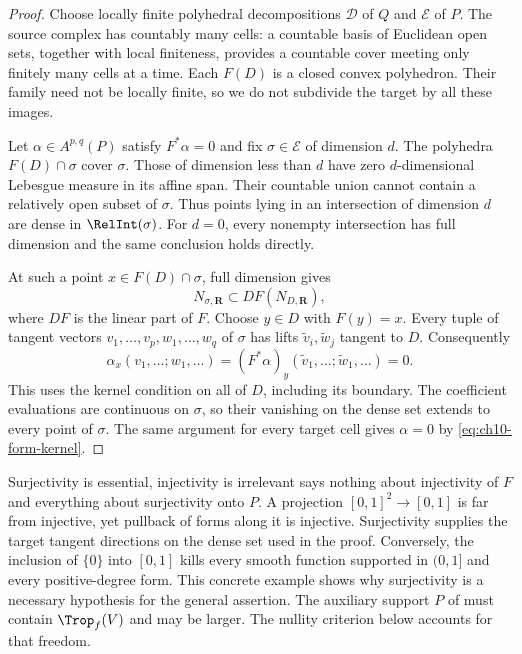 \begin{proof}
Choose locally finite polyhedral decompositions $\mathscr D$ of $Q$ and
$\mathscr E$ of $P$.  The source complex has countably many cells: a
countable basis of Euclidean open sets, together with local finiteness,
provides a countable cover meeting only finitely many cells at a time.
Each $F(D)$ is a closed convex polyhedron.  Their family need not be
locally finite, so we do not subdivide the target by all these images.

Let $\alpha\in A^{p,q}(P)$ satisfy $F^*\alpha=0$ and fix
$\sigma\in\mathscr E$ of dimension $d$.  The polyhedra
$F(D)\cap\sigma$ cover $\sigma$.  Those of dimension less than $d$ have
zero $d$-dimensional Lebesgue measure in its affine span.  Their countable
union cannot contain a relatively open subset of $\sigma$.  Thus points
lying in an intersection of dimension $d$ are dense in
$\RelInt(\sigma)$.  For $d=0$, every nonempty intersection has full
dimension and the same conclusion holds directly.

At such a point $x\in F(D)\cap\sigma$, full dimension gives
\[
 N_{\sigma,\mathbf R}\subset DF(N_{D,\mathbf R}),
\]
where $DF$ is the linear part of $F$.  Choose $y\in D$ with $F(y)=x$.
Every tuple of tangent vectors $v_1,\ldots,v_p,w_1,\ldots,w_q$ of $\sigma$
has lifts $\widetilde v_i,\widetilde w_j$ tangent to $D$.  Consequently
\[
 \alpha_x(v_1,\ldots;w_1,\ldots)
 =(F^*\alpha)_y(\widetilde v_1,\ldots;\widetilde w_1,\ldots)=0.
\]
This uses the kernel condition on all of $D$, including its boundary.
The coefficient evaluations are continuous on $\sigma$, so their
vanishing on the dense set extends to every point of $\sigma$.
The same argument for every target cell gives $\alpha=0$ by
\eqref{eq:ch10-form-kernel}.
\end{proof}

\begin{warning}{Surjectivity is essential, injectivity is irrelevant}
 says nothing about
injectivity of $F$ and everything about surjectivity onto $P$.  A projection
$[0,1]^2\to[0,1]$ is far from injective, yet pullback of forms along it
is injective.  Surjectivity supplies the target tangent directions on the
dense set used in the proof.  Conversely, the inclusion of $\{0\}$ into
$[0,1]$ kills every smooth function supported in $(0,1]$ and every
positive-degree form.  This concrete example shows why surjectivity is a
necessary hypothesis for the general assertion.  The auxiliary support $P$
of  must contain $\Trop_f(V)$ and may be
larger.  The nullity criterion below accounts for that freedom.
\end{warning}

